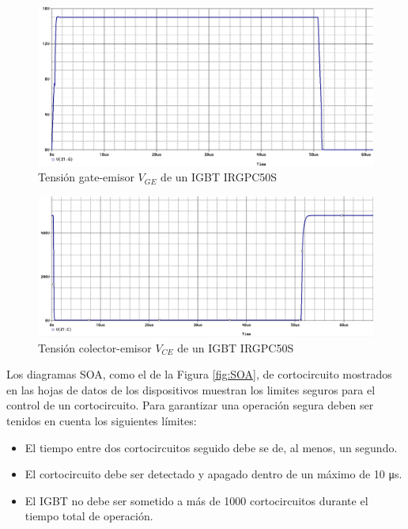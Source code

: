 \documentclass[conference]{IEEEtran}
\begin{document}
\begin{figure}[H]
	\centering
	\includegraphics[width=\columnwidth]{imagenes/vge_igbt}
	\caption{Tensión gate-emisor $V_{GE}$ de un IGBT IRGPC50S}
	\label{fig:vge_igbt}
\end{figure}

\begin{figure}[H]
	\centering
	\includegraphics[width=\columnwidth]{imagenes/vce_igbt}
	\caption{Tensión colector-emisor $V_{CE}$ de un IGBT IRGPC50S}
	\label{fig:vce_igbt}
\end{figure}


Los diagramas SOA, como el de la Figura \ref{fig:SOA}, de cortocircuito mostrados en las hojas de datos de los dispositivos muestran los limites seguros para el control de un cortocircuito.
Para garantizar una operación segura deben ser tenidos en cuenta los siguientes límites:
\begin{itemize}
	\item El tiempo entre dos cortocircuitos seguido debe se de, al menos, un segundo.
	\item El cortocircuito debe ser detectado y apagado dentro de un máximo de 10 μs.
	\item El IGBT no debe ser sometido a más de 1000 cortocircuitos durante el tiempo total de operación. 
\end{itemize}
\end{document}
